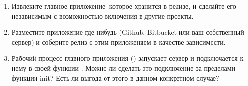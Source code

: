 \documentclass[11pt, oneside]{book}   	%
\begin{document}
\begin{enumerate}
	\item Извлеките главное приложение, которое хранится в релизе, и сделайте его независимым с возможностью включения в другие проекты.
	\item Разместите приложение где-нибудь (Github, Bitbucket или ваш собственный сервер) и соберите релиз с этим приложением в качестве зависимости.
	\item Рабочий процесс главного приложения () запускает сервер и подключается к нему в своей функции . Можно ли сделать это подключение за пределами функции init? Есть ли выгода от этого в данном конкретном случае?
\end{enumerate}

\end{document}
